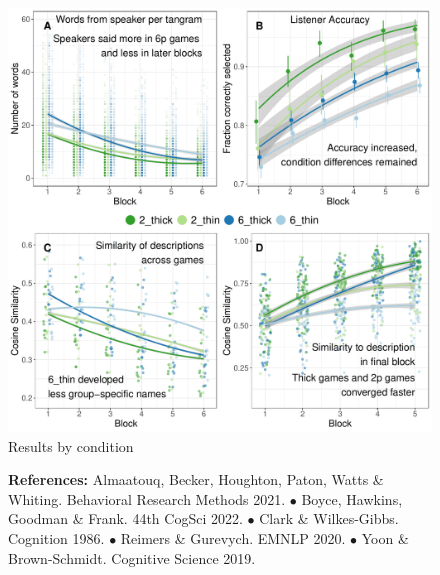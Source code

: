 \documentclass[11pt,a4paper]{article}
\begin{document}
\begin{figure}
	\includegraphics[width=\textwidth]{../images/CAMP1.pdf}
	\caption{Results by condition}
\end{figure}

\begin{figure}\textbf{References:}  Almaatouq, Becker, Houghton, Paton, Watts \& Whiting. Behavioral Research Methods 2021. 
$\bullet$ Boyce, Hawkins, Goodman \& Frank. 44th CogSci 2022.
$\bullet$ Clark \& Wilkes-Gibbs. Cognition 1986.
$\bullet$ Reimers \& Gurevych. EMNLP 2020. 
$\bullet$ Yoon \& Brown-Schmidt. Cognitive Science 2019.
  \end{figure}
\end{document}
